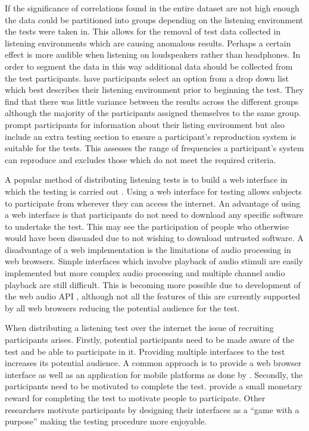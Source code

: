 			If the significance of correlations found in the entire dataset are not high enough the data could
			be partitioned into groups depending on the listening environment the tests were taken in. This
			allows for the removal of test data collected in listening environments which are causing anomalous
			results. Perhaps a certain effect is more audible when listening on loudspeakers rather than
			headphones. In order to segment the data in this way additional data should be collected from the
			test participants.  \citet{wilmering2013audio} have participants select an option from a drop down
			list which best describes their listening environment prior to beginning the test. They find that
			there was little variance between the results across the different groups although the majority of
			the participants assigned themselves to the same group. \citet{seetharaman2014crowdsourcing} prompt
			participants for information about their listing environment but also include an extra testing
			section to ensure a participant's reproduction system is suitable for the tests. This assesses the
			range of frequencies a participant's system can reproduce and excludes those which do not meet the
			required criteria.
			
			A popular method of distributing listening tests is to build a web interface in which the testing
			is carried out \citep{wilmering2013audio, cartwright2013socialeq, seetharaman2014crowdsourcing}.
			Using a web interface for testing allows subjects to participate from wherever they can access the
			internet. An advantage of using a web interface is that participants do not need to download any
			specific software to undertake the test. This may see the participation of people who otherwise
			would have been dissuaded due to not wishing to download untrusted software. A disadvantage of a
			web implementation is the limitations of audio processing in web browsers. Simple interfaces which
			involve playback of audio stimuli are easily implemented but more complex audio processing and
			multiple channel audio playback are still difficult. This is becoming more possible due to
			development of the web audio API \citep{adenot2015web}, although not all the features of this are
			currently supported by all web browsers reducing the potential audience for the test.

			When distributing a listening test over the internet the issue of recruiting participants arises.
			Firstly, potential participants need to be made aware of the test and be able to participate in it.
			Providing multiple interfaces to the test increases its potential audience. A common approach is to
			provide a web browser interface as well as an application for mobile platforms as done by
			\citet{huq2010crowdsourcing}. Secondly, the participants need to be motivated to complete the test.
			\citet{cartwright2013socialeq} provide a small monetary reward for completing the test to motivate
			people to participate. Other researchers motivate participants by designing their interfaces as a
			``game with a purpose'' \citep{law2007tagatune, huq2010crowdsourcing, burgoyne2013hooked,
			wolff2014spot} making the testing procedure more enjoyable.

